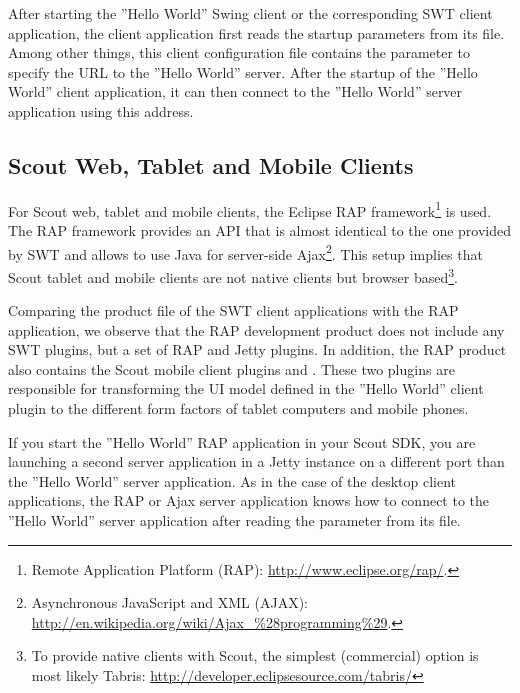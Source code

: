 \documentclass[a4paper,10pt,twoside]{book}
\begin{document}
After starting the ''Hello World'' Swing client or the corresponding SWT client application, the client application first reads the startup parameters from its  file.
Among other things, this client configuration file contains the parameter  to specify the URL to the ''Hello World'' server. 
After the startup of the ''Hello World'' client application, it can then connect to the ''Hello World'' server application using this address.

\subsection{Scout Web, Tablet and Mobile Clients}

For Scout web, tablet and  mobile clients, the Eclipse RAP framework\footnote{
Remote Application Platform (RAP): \url{http://www.eclipse.org/rap/}.
}
is used.
The RAP framework provides an API that is almost identical to the one provided by SWT and allows to use Java for server-side Ajax\footnote{
Asynchronous JavaScript and XML (AJAX): \url{http://en.wikipedia.org/wiki/Ajax_\%28programming\%29}.
}.
This setup implies that Scout tablet and mobile clients are not native clients but browser based\footnote{
To provide native clients with Scout, the simplest (commercial) option is most likely Tabris: \url{http://developer.eclipsesource.com/tabris/}
}.

Comparing the product file of the SWT client applications with the RAP application, we observe that the RAP development product does not include any SWT plugins, but a set of RAP and Jetty plugins.
In addition, the RAP product also contains the Scout mobile client plugins  and .
These two plugins are responsible for transforming the UI model defined in the ''Hello World'' client plugin to the different form factors of tablet computers and mobile phones.

If you start the ''Hello World'' RAP application in your Scout SDK, you are launching a second server application in a Jetty instance on a different port than the ''Hello World'' server application.
As in the case of the desktop client applications, the RAP or Ajax server application knows how to connect to the ''Hello World'' server application after reading the parameter  from its  file.
\end{document}
